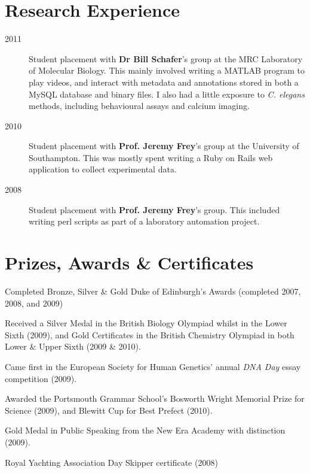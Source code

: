\documentclass[letterpaper]{article}
\renewenvironment{itemize}{
  \begin{list}{}{
    \setlength{\leftmargin}{1.5em}
  }
}{
  \end{list}
}
\begin{document}
\section*{Research Experience}
\begin{description}
	\item[2011] Student placement with {\bf Dr Bill Schafer}'s group at the MRC Laboratory of Molecular Biology. This mainly involved writing a MATLAB program to play videos, and interact with metadata and annotations stored in both a MySQL database and binary files. I also had a little exposure to \textit{C. elegans} methods, including behavioural assays and calcium imaging.
	\item[2010] Student placement with {\bf Prof. Jeremy Frey}'s group at the University of Southampton. This was mostly spent writing a Ruby on Rails web application to collect experimental data. 
	\item[2008] Student placement with {\bf Prof. Jeremy Frey}'s group. This included writing perl scripts as part of a laboratory automation project.
\end{description}

\section*{Prizes, Awards \& Certificates}
\begin{itemize}
	\item Completed Bronze, Silver \& Gold Duke of Edinburgh's Awards (completed 2007, 2008, and 2009)
	\item Received a Silver Medal in the British Biology Olympiad whilst in the Lower Sixth (2009), and Gold Certificates in the British Chemistry Olympiad in both Lower \& Upper Sixth (2009 \& 2010). 
	\item Came first in the European Society for Human Genetics' annual \textit{DNA Day} essay competition (2009). 
	\item Awarded the Portsmouth Grammar School's Bosworth Wright Memorial Prize for Science (2009), and Blewitt Cup for Best Prefect (2010).
 	\item Gold Medal in Public Speaking from the New Era Academy with distinction (2009).
	\item Royal Yachting Association Day Skipper certificate (2008)
\end{itemize}
\end{document}
